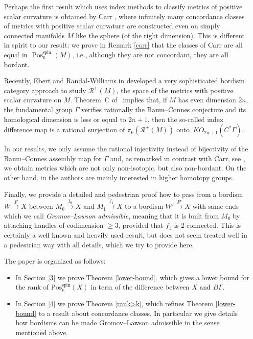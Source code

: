 \documentclass[pdftex]{sigma}
\numberwithin{equation}{section}
\DeclareMathOperator{\Pos}{Pos}
\DeclareMathOperator{\spin}{spin}
\begin{document}
 Perhaps the first result which uses index methods to classify metrics of
 positive scalar curvature is obtained by Carr \cite{Carr}, where infinitely many concordance
 classes of metrics with positive scalar curvature are constructed even on
 simply
 connected manifolds $M$ like the sphere (of the right dimension). This is
 different in spirit to
 our result: we prove in Remark \ref{carr} that the classes of Carr are all equal in $
 \Pos^{\spin}_n(M)$, i.e., although they are not concordant, they are all
 bordant.

 Recently, Ebert and Randal-Williams in \cite{EbertRW} developed a
 very sophisticated bordism category approach to study $\mathcal{R}^+(M)$,
 the space of the metrics with positive
 scalar curvature on $M$. Theorem~C of~\cite{EbertRW} implies that, if $M$ has even dimension $2n$, the fundamental
 group $\Gamma$ verifies rationally the Baum--Connes conjecture and its
 homological dimension is less or equal to $2n+1$, then the so-called index
 difference map
 is a rational surjection of $\pi_0(\mathcal{R}^+(M))$ onto~$KO_{2n+1}(C^*\Gamma)$.

 In our results, we only assume the
 rational injectivity instead of bijectivity of the Baum--Connes assembly map
 for $\Gamma$ and, as remarked in contrast with Carr, see \cite{Carr}, we obtain metrics
 which are not only non-isotopic, but also non-bordant. On the other hand, in
 \cite{EbertRW} the authors are mainly interested in higher homotopy
 groups.

 Finally, we provide a detailed and pedestrian proof how to pass from a bordism $W\xrightarrow{F}X$ between
 $M_0\xrightarrow{f_0}X$ and $M_1\xrightarrow{f_1}X$ to a bordism
 $W'\xrightarrow{F'}X$ with same ends which we call \emph{Gromov--Lawson
 admissible}, meaning that it is built from $M_0$ by attaching
 handles of codimension $\ge 3$, provided that
 $f_1$ is 2-connected. This is certainly a well known and heavily used
 result, but does not seem treated well in a pedestrian way with all details,
 which we try to provide here.

 The paper is organized as follows:
 \begin{itemize}\itemsep=0pt
\item In Section \ref{3} we prove Theorem \ref{lower-bound}, which gives a lower bound for the rank of $\mathrm{Pos}^{\spin}_{n}(X)$ in term of the difference between $X$ and $B\Gamma$.
 \item In Section \ref{4} we prove Theorem \ref{rank>k}, which refines
 Theorem \ref{lower-bound} to a result about concordance classes. In
 particular we give details how bordisms can
 be made Gromov--Lawson admissible in the sense mentioned above.
 \end{itemize}
\end{document}
